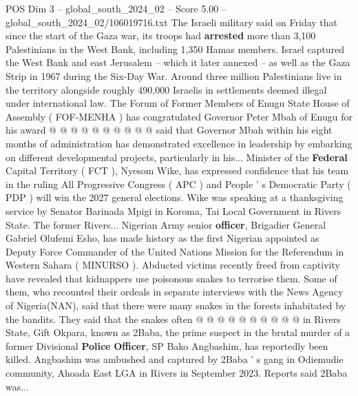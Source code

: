\begin{textsample}{POS Dim 3 – global\_south\_2024\_02 – Score 5.00 – global\_south\_2024\_02/106019716.txt}
The Israeli military said on Friday that since the start of the Gaza war, its troops had \textbf{arrested} more than 3,100 Palestinians in the West Bank, including 1,350 Hamas members.
Israel captured the West Bank and east Jerusalem -- which it later annexed -- as well as the Gaza Strip in 1967 during the Six-Day War.
Around three million Palestinians live in the territory alongside roughly 490,000 Israelis in settlements deemed illegal under international law.
The Forum of Former Members of Enugu State House of Assembly ( FOF-MENHA ) has congratulated Governor Peter Mbah of Enugu for his award @ @ @ @ @ @ @ @ @ @ said that Governor Mbah within his eight months of administration has demonstrated excellence in leadership by embarking on different developmental projects, particularly in his...
Minister of the \textbf{Federal} Capital Territory ( FCT ), Nyesom Wike, has expressed confidence that his team in the ruling All Progressive Congress ( APC ) and People ' s Democratic Party ( PDP ) will win the 2027 general elections.
Wike was speaking at a thanksgiving service by Senator Barinada Mpigi in Koroma, Tai Local Government in Rivers State.
The former Rivers...
Nigerian Army senior \textbf{officer}, Brigadier General Gabriel Olufemi Esho, has made history as the first Nigerian appointed as Deputy Force Commander of the United Nations Mission for the Referendum in Western Sahara ( MINURSO ).
Abducted victims recently freed from captivity have revealed that kidnappers use poisonous snakes to terrorise them.
Some of them, who recounted their ordeals in separate interviews with the News Agency of Nigeria(NAN), said that there were many snakes in the forests inhabitated by the bandits.
They said that the snakes often @ @ @ @ @ @ @ @ @ @ in Rivers State, Gift Okpara, known as 2Baba, the prime suspect in the brutal murder of a former Divisional \textbf{Police} \textbf{Officer}, SP Bako Angbashim, has reportedly been killed.
Angbashim was ambushed and captured by 2Baba ' s gang in Odiemudie community, Ahoada East LGA in Rivers in September 2023.
Reports said 2Baba was...

\end{textsample}
